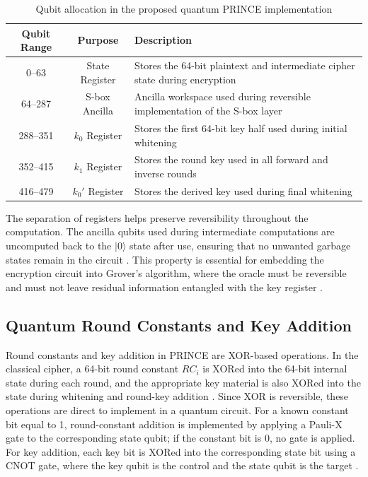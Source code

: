 \documentclass[11pt,a4paper]{article}
\begin{document}
\begin{table}[H]
\centering
\caption{Qubit allocation in the proposed quantum PRINCE implementation}
\label{tab:qubit_distribution}
\begin{tabular}{|c|c|p{7cm}|}
\hline
\textbf{Qubit Range} & \textbf{Purpose} & \textbf{Description} \\
\hline
0--63 & State Register & Stores the 64-bit plaintext and intermediate cipher state during encryption \\
\hline
64--287 & S-box Ancilla & Ancilla workspace used during reversible implementation of the S-box layer \\
\hline
288--351 & $k_0$ Register & Stores the first 64-bit key half used during initial whitening \\
\hline
352--415 & $k_1$ Register & Stores the round key used in all forward and inverse rounds \\
\hline
416--479 & $k_0'$ Register & Stores the derived key used during final whitening \\
\hline
\end{tabular}
\end{table}

The separation of registers helps preserve reversibility throughout the computation. The ancilla qubits used during intermediate computations are uncomputed back to the $|0\rangle$ state after use, ensuring that no unwanted garbage states remain in the circuit \cite{bennett1973logical}. This property is essential for embedding the encryption circuit into Grover's algorithm, where the oracle must be reversible and must not leave residual information entangled with the key register \cite{nielsen2010quantum,grassl2016applying}.

\subsection{Quantum Round Constants and Key Addition}

Round constants and key addition in PRINCE are XOR-based operations. In the classical cipher, a 64-bit round constant $RC_i$ is XORed into the 64-bit internal state during each round, and the appropriate key material is also XORed into the state during whitening and round-key addition \cite{borghoff2012prince}. Since XOR is reversible, these operations are direct to implement in a quantum circuit. For a known constant bit equal to 1, round-constant addition is implemented by applying a Pauli-X gate to the corresponding state qubit; if the constant bit is 0, no gate is applied. For key addition, each key bit is XORed into the corresponding state bit using a CNOT gate, where the key qubit is the control and the state qubit is the target \cite{nielsen2010quantum,barenco1995elementary}.
\end{document}
